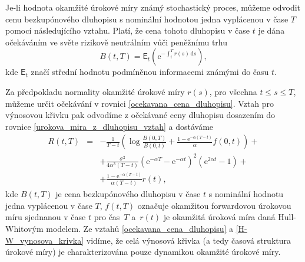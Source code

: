 \documentclass[a4paper,12pt]{report}
\theoremstyle{definition} \newtheorem{definice}[veta]{Definice}
\theoremstyle{remark}
\begin{document}
Je-li hodnota okamžité úrokové míry známý stochastický proces, můžeme odvodit cenu bezkupónového dluhopisu s nominální hodnotou jedna vyplácenou v čase $T$ pomocí následujícího vztahu.
Platí, že cena tohoto dluhopisu v čase $t$ je dána očekáváním ve světe rizikově neutrálním vůči peněžnímu trhu
\begin{equation}\label{ocekavana_cena_dluhopisu}
B(t,T)=\mathsf{E}_t\left(\mathrm{e}^{-\int_{t}^T r(s)\,\mathrm{d}s}\right),
\end{equation}
kde $\mathsf{E}_t$ značí střední hodnotu podmíněnou informacemi známými do času $t$.

Za předpokladu normality okamžité úrokové míry $r(s)$, pro všechna $t\leq s\leq T$, můžeme určit očekávání v rovnici \eqref{ocekavana_cena_dluhopisu}.
Vztah pro výnosovou křivku pak odvodíme z očekávané ceny dluhopisu dosazením do rovnice \eqref{urokova_mira_z_dluhopisu_vztah} a dostáváme
\begin{eqnarray}\label{H-W_vynosova_krivka}
R(t,T)&=&-\frac{1}{T-t}\left(\log \frac{B(0,T)}{B(0,t)}+\frac{1-\mathrm{e}^{-\alpha(T-t)}}{\alpha}f(0,t)\right)+ \nonumber\\
&&+\frac{\sigma^2}{4\alpha^3(T-t)}\left(\mathrm{e}^{-\alpha T}-\mathrm{e}^{-\alpha t}\right)^2\left(\mathrm{e}^{2\alpha t}-1\right)+  \nonumber\\
&&+\frac{1-\mathrm{e}^{-\alpha(T-t)}}{\alpha(T-t)}r(t),
\end{eqnarray}
kde $B(t,T)$ je cena bezkupónového dluhopisu v čase $t$ %
s nominální hodnotu jedna vyplácenou v čase $T$,
$f(t,T)$ označuje okamžitou forwardovou úrokovou míru sjednanou v čase $t$ pro čas~$T$ 
a~$r(t)$ je okamžitá úroková míra daná Hull-Whitovým modelem.
Ze vztahů \eqref{ocekavana_cena_dluhopisu} a \eqref{H-W_vynosova_krivka} vidíme, že celá výnosová křivka (a tedy časová struktura úrokové míry) je charakterizována pouze dynamikou okamžité úrokové míry.

\end{document}
